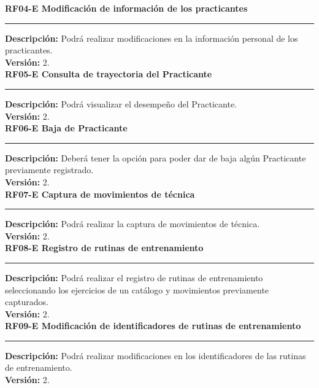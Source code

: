 \textbf{\textcolor[rgb]{0, 0, 0.545098}{RF04-E \hspace{2cm} Modificación de información de los practicantes}}\\
\rule[3mm]{17cm}{0.1mm}
\label{rf:RF04-E}
\textbf{Descripción: } Podrá realizar modificaciones en la información personal de los practicantes. \\
\textbf{Versión: } 2. \\

\textbf{\textcolor[rgb]{0, 0, 0.545098}{RF05-E \hspace{2cm} Consulta de trayectoria del Practicante}}\\
\rule[3mm]{17cm}{0.1mm}
\label{rf:RF05-E}
\textbf{Descripción: } Podrá visualizar el desempeño del Practicante. \\
\textbf{Versión: } 2. \\

\textbf{\textcolor[rgb]{0, 0, 0.545098}{RF06-E \hspace{2cm} Baja de Practicante}}\\
\rule[3mm]{17cm}{0.1mm}
\label{rf:RF06-E}
\textbf{Descripción: } Deberá tener la opción para poder dar de baja algún Practicante previamente registrado. \\
\textbf{Versión: } 2. \\

\textbf{\textcolor[rgb]{0, 0, 0.545098}{RF07-E \hspace{2cm} Captura de movimientos de técnica}}\\
\rule[3mm]{17cm}{0.1mm}
\label{rf:RF07-E}
\textbf{Descripción: } Podrá realizar la captura de movimientos de técnica. \\
\textbf{Versión: } 2. \\

\textbf{\textcolor[rgb]{0, 0, 0.545098}{RF08-E \hspace{2cm} Registro de rutinas de entrenamiento}}\\
\rule[3mm]{17cm}{0.1mm}
\label{rf:RF08-E}
\textbf{Descripción: } Podrá realizar el registro de rutinas de entrenamiento seleccionando los ejercicios de un catálogo y movimientos previamente capturados. \\
\textbf{Versión: } 2. \\

\textbf{\textcolor[rgb]{0, 0, 0.545098}{RF09-E \hspace{2cm} Modificación de identificadores de rutinas de entrenamiento}}\\
\rule[3mm]{17cm}{0.1mm}
\label{rf:RF09-E}
\textbf{Descripción: } Podrá realizar modificaciones en los identificadores de las rutinas de entrenamiento. \\
\textbf{Versión: } 2. \\

